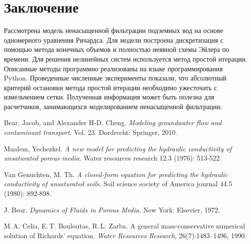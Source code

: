 \documentclass[a4paper,12pt]{article}
\begin{document}
\section{Заключение}
Рассмотрена модель ненасыщенной фильтрации подземных вод на основе одномерного уравнения Ричардса. Для модели построена дискретизация с помощью метода конечных объемов и полностью неявной схемы Эйлера по времени. Для решения нелинейных систем используется метод простой итерации. Описанные методы программно реализованы на языке программирования Python. Проведенные численные эксперименты показали, что абсолютный критерий остановки метода простой итерации необходимо ужесточать с измельчением сетки. Полученная информация может быть полезна для расчетчиков, занимающихся моделированием ненасыщенной фильтрации.
\begin{thebibliography}{9}
	Bear, Jacob, and Alexander H-D. Cheng. \textit{Modeling groundwater flow and contaminant transport}. Vol. 23. Dordrecht: Springer, 2010.
	
	Mualem, Yechezkel. \textit{A new model for predicting the hydraulic conductivity of unsaturated porous media.} Water resources research 12.3 (1976): 513-522.
	
	Van Genuchten, M. Th. \textit{A closed‐form equation for predicting the hydraulic conductivity of unsaturated soils.} Soil science society of America journal 44.5 (1980): 892-898.
	
J. Bear. \emph{Dynamics of Fluids in Porous Media}. New York: Elsevier, 1972.

M.\,A. Celia, E.\,T. Bouloutas, R.\,L. Zarba. A general mass-conservative numerical solution of Richards' equation. \emph{Water Resources Research}, 26(7):1483–1496, 1990.

\end{thebibliography}

\end{document}
